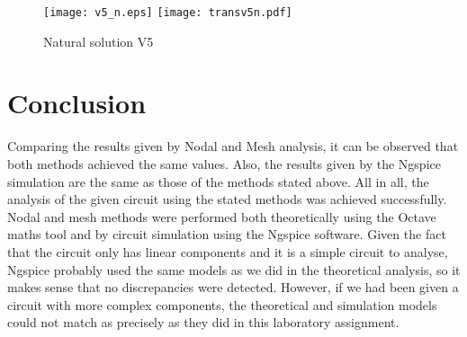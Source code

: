 \begin{figure}[h] \centering
\texttt{[image: v5\_n.eps]}
\texttt{[image: transv5n.pdf]}
\caption{Natural solution V5}
\label{fig:comparison5}
\end{figure}
\FloatBarrier


\section{Conclusion}
\label{sec:conclusion}
Comparing the results given by Nodal and Mesh analysis, it can be observed that both methods achieved the same values. Also, the results given by the Ngspice simulation are the same as those of the methods stated above.  
All in all, the analysis of the given circuit using the stated methods was achieved successfully. Nodal and mesh methods were performed both theoretically using the Octave maths tool and by circuit simulation using the Ngspice software. 
Given the fact that the circuit only has linear components and it is a simple circuit to analyse, Ngspice probably used the same models as we did in the theoretical analysis, so it makes sense that no discrepancies were detected. However, if we had been given a circuit with more complex components, the theoretical and simulation models could not match as precisely as they did in this laboratory assignment. 

